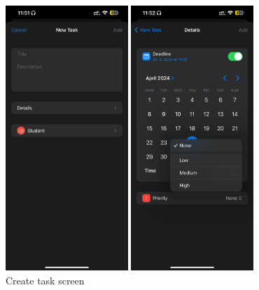 \documentclass[
  biblatex = false,
  language=english,
  figures=false,
  sourcecodes,
  glossaries,
  index
]{kidiplom}
\begin{document}
\begin{figure}[h!]
\centering
\begin{minipage}[b]{0.4\textwidth}
	\includegraphics[height=10cm]{image10}
\end{minipage}
\begin{minipage}[b]{0.4\textwidth}
	\includegraphics[height=10cm]{image11}
\end{minipage}
\caption{Create task screen}
\label{fig:image10-11}
\end{figure}
\end{document}
